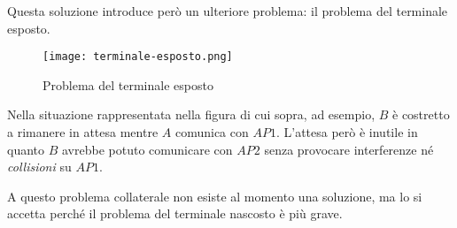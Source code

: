 \bigskip\noindent
Questa soluzione introduce però un ulteriore problema: il problema del terminale
esposto.

\begin{figure}[h!]
    \centering
    \texttt{[image: terminale-esposto.png]}
    \caption{Problema del terminale esposto}
\end{figure}\noindent
Nella situazione rappresentata nella figura di cui sopra, ad esempio, $B$ è
costretto a rimanere in attesa mentre $A$ comunica con $AP1$. L'attesa però è
inutile in quanto $B$ avrebbe potuto comunicare con $AP2$ senza provocare
interferenze né \emph{collisioni} su $AP1$.

A questo problema collaterale non esiste al momento una soluzione, ma lo si
accetta perché il problema del terminale nascosto è più grave.